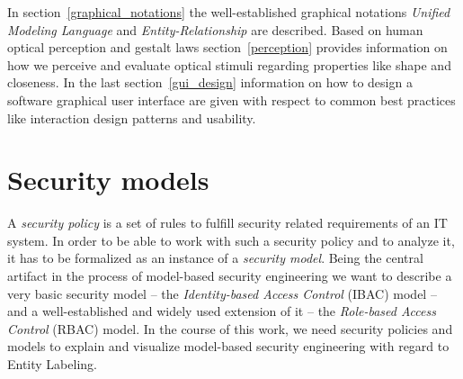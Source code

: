 \documentclass[twoside, openright, 12pt]{book}
\begin{document}
In section~\ref{graphical_notations} the well-established graphical notations \textit{Unified Modeling Language} and \textit{Entity-Relationship} are described.
Based on human optical perception and gestalt laws section~\ref{perception} provides information on how we perceive and evaluate optical stimuli regarding properties like shape and closeness.
In the last section~\ref{gui_design} information on how to design a software graphical user interface are given with respect to common best practices like interaction design patterns and usability.

\section{Security models}
\label{security_models}
A \textit{security policy} is a set of rules to fulfill security related requirements of an IT system.
In order to be able to work with such a security policy and to analyze it, it has to be formalized as an instance of a \textit{security model}.
Being the central artifact in the process of model-based security engineering we want to describe a very basic security model -- the \textit{Identity-based Access Control} (IBAC) model -- and a well-established and widely used extension of it -- the \textit{Role-based Access Control} (RBAC) model.
In the course of this work, we need security policies and models to explain and visualize model-based security engineering with regard to Entity Labeling.


\end{document}
